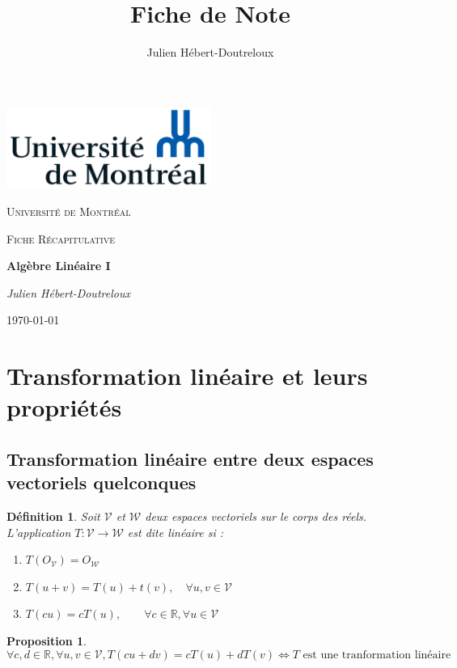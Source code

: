 \documentclass{article}[french, babel]
\author{Julien Hébert-Doutreloux}
\title{Fiche de Note}
\newtheorem{mydef}{Définition}
\newtheorem{myprop}{Proposition}
\let\stdsection\section
\renewcommand\section{\newpage\stdsection}
\begin{document}
		\begin{titlepage}
		\centering
		\includegraphics[width=0.5\textwidth]{Universite_de_Montreal_logo}\par\vspace{1cm}
		{\scshape\LARGE Université de Montréal\par}
		\vspace{1cm}
		{\scshape\Large Fiche Récapitulative\par}
		\vspace{1.5cm}
		{\huge\bfseries Algèbre Linéaire I\par}
		\vspace{2cm}
		{\Large\itshape Julien Hébert-Doutreloux\par}
		\vfill
		\vfill
		{\large \today\par}
	\end{titlepage}
\setcounter{page}{2}
	\tableofcontents
	\newpage
\section{Transformation linéaire et leurs propriétés}
	\subsection{Transformation linéaire entre deux espaces vectoriels quelconques}
		\begin{mydef}
				Soit $\mathcal{V}$ et $\mathcal{W}$ deux espaces vectoriels sur le corps des réels. L'application $T:\mathcal{V}\longrightarrow\mathcal{W}$ est dite linéaire si :
				\begin{enumerate}
					\item $T(O_{\mathcal{V}})=O_{\mathcal{W}}$
					\item $T(u+v)=T(u)+t(v),\quad\forall u,v\in\mathcal{V}$
					\item $T(cu)=cT(u),\quad\quad\forall c\in\mathbb{R}, \forall u\in\mathcal{V}$
				\end{enumerate}
			\end{mydef}
		\begin{myprop}
				\[\forall c,d\in\mathbb{R},\forall u,v\in\mathcal{V},T(cu+dv)=cT(u)+dT(v) \Longleftrightarrow T \text{ est une tranformation linéaire} \]
		\end{myprop}
\end{document}
